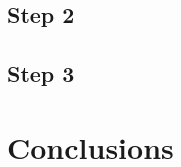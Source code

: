 \documentclass{article}
\begin{document}
\subsection{Step 2}

\subsection{Step 3}

\section{Conclusions}

\end{document}
